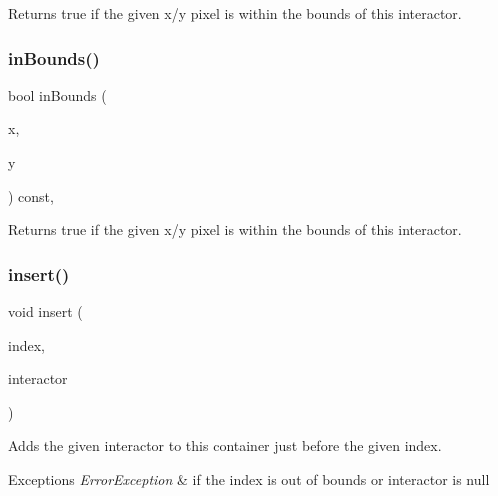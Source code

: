 Returns true if the given x/y pixel is within the bounds of this interactor. 

\mbox{\label{classGInteractor_ae6d7982c1c627b677a5e776ca86118ed}} 
\subsubsection{\texorpdfstring{in\+Bounds()}{inBounds()}\hspace{0.1cm}{\footnotesize\ttfamily [2/2]}}
{\footnotesize\ttfamily bool in\+Bounds (\begin{DoxyParamCaption}\item[{int}]{x,  }\item[{int}]{y }\end{DoxyParamCaption}) const\hspace{0.3cm}{\ttfamily [virtual]}, {\ttfamily [inherited]}}



Returns true if the given x/y pixel is within the bounds of this interactor. 

\mbox{\label{classGContainer_afffb8f789ff9a8466fbae5b846a0ebe7}} 
\subsubsection{\texorpdfstring{insert()}{insert()}\hspace{0.1cm}{\footnotesize\ttfamily [1/2]}}
{\footnotesize\ttfamily void insert (\begin{DoxyParamCaption}\item[{int}]{index,  }\item[{\mbox{\hyperlink{classGInteractor}{G\+Interactor}} $\ast$}]{interactor }\end{DoxyParamCaption})\hspace{0.3cm}{\ttfamily [virtual]}}



Adds the given interactor to this container just before the given index. 


\begin{DoxyExceptions}{Exceptions}
{\em Error\+Exception} & if the index is out of bounds or interactor is null \\
\hline
\end{DoxyExceptions}
\mbox{\label{classGContainer_a2e9d7c6d9e6769d4cfd3293afe7e215c}} 
